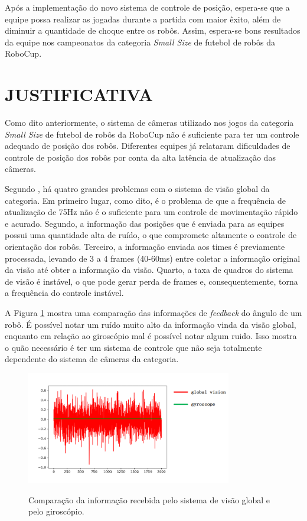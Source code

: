 \documentclass[acronym, symbols]{fei}
\begin{document}
		Após a implementação do novo sistema de controle de posição, espera-se que a equipe possa realizar as jogadas durante a partida com maior êxito, além de diminuir a quantidade de choque entre os robôs. Assim, espera-se bons resultados da equipe nos campeonatos da categoria \textit{Small Size} de futebol de robôs da RoboCup.
		
	\section{JUSTIFICATIVA}
	
		Como dito anteriormente, o sistema de câmeras utilizado nos jogos da categoria \textit{Small Size} de futebol de robôs da RoboCup não é suficiente para ter um controle adequado de posição dos robôs. Diferentes equipes já relataram dificuldades de controle de posição dos robôs por conta da alta latência de atualização das câmeras.
		
		Segundo \textcite{tdpZJUNlict2020}, há quatro grandes problemas com o sistema de visão global da categoria. Em primeiro lugar, como dito, é o problema de que a frequência de atualização de 75Hz não é o suficiente para um controle de movimentação rápido e acurado. Segundo, a informação das posições que é enviada para as equipes possui uma quantidade alta de ruído, o que compromete altamente o controle de orientação dos robôs. Terceiro, a informação enviada aos times é previamente processada, levando de 3 a 4 frames (40-60ms) entre coletar a informação original da visão até obter a informação da visão. Quarto, a taxa de quadros do sistema de visão é instável, o que pode gerar perda de frames e, consequentemente, torna a frequência do controle instável.
		
		A Figura \ref{fig:comparison_cameras_gyroscope} mostra uma comparação das informações de \textit{feedback} do ângulo de um robô. É possível notar um ruído muito alto da informação vinda da visão global, enquanto em relação ao giroscópio mal é possível notar algum ruido. Isso mostra o quão necessário é ter um sistema de controle que não seja totalmente dependente do sistema de câmeras da categoria.
		
		\begin{figure}[!htb]
			\centering
			\caption{Comparação da informação recebida pelo sistema de visão global e pelo giroscópio.} 
			\includegraphics[width=0.8\textwidth]{Comparacao_cameras_giroscopio.png}
			\label{fig:comparison_cameras_gyroscope}
		\end{figure}
	
\end{document}
